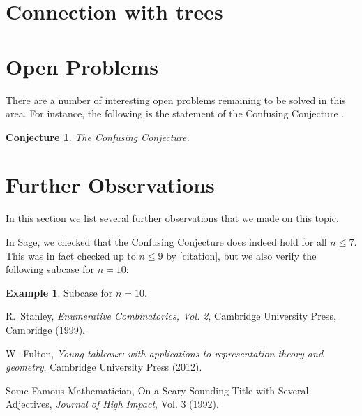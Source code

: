 \documentclass[11pt]{article}
\newtheorem{conjecture}[theorem]{Conjecture}
\theoremstyle{definition}
\newtheorem{example}[theorem]{Example}
\numberwithin{theorem}{section}
\begin{document}
\section{Connection with trees}

\section{Open Problems}

There are a number of interesting open problems remaining to be solved in this area.  For instance, the following is the statement of the Confusing Conjecture \cite{FancyGuy}.

\begin{conjecture}
  The Confusing Conjecture.
\end{conjecture}


\section{Further Observations}

In this section we list several further observations that we made on this topic.  

In Sage, we checked that the Confusing Conjecture does indeed hold for all $n\le 7$.  This was in fact checked up to $n\le 9$ by [citation], but we also verify the following subcase for $n=10$:

\begin{example}
    Subcase for $n=10$.
\end{example}




\begin{thebibliography}{99}
 R.~Stanley, \textit{Enumerative Combinatorics, Vol. 2}, Cambridge University Press, Cambridge (1999).

 W.~Fulton, \textit{Young tableaux: with applications to representation theory and geometry}, Cambridge University Press (2012). 

 Some Famous Mathematician, On a Scary-Sounding Title with Several Adjectives, \textit{Journal of High Impact}, Vol. 3 (1992).

\end{thebibliography}
\end{document}
